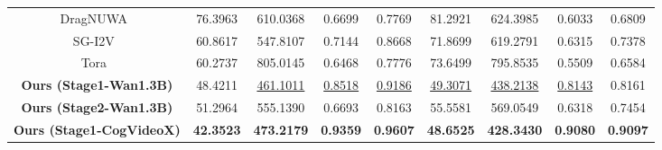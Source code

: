 \begin{table}[h]
{\begin{tabular}{c|cccc|cccc}
DragNUWA~\cite{yin2023dragnuwa}                                 & 76.3963                              & 610.0368                              & 0.6699                                    & 0.7769                                    & 81.2921                              & 624.3985                              & 0.6033                                    & 0.6809                                   \\
SG-I2V~\cite{namekata2024sgi2v}                                 & 60.8617                              & 547.8107                              & 0.7144                                    & 0.8668                                    & 71.8699                              & 619.2791                              & 0.6315                                    & 0.7378                                   \\
Tora~\cite{zhang2025tora} & 60.2737                              & 805.0145                              & 0.6468                                    & 0.7776                                    & 73.6499                              & 795.8535                              & 0.5509                                    & 0.6584                                   \\ \hline
\textbf{Ours (Stage1-Wan1.3B)}                                                                 & 48.4211                          & \underline{461.1011}                          & \underline{0.8518}                          & \underline{0.9186}                          & \underline{49.3071}                          & \underline{438.2138}                          & \underline{0.8143}                          & 0.8161                          \\
\textbf{Ours (Stage2-Wan1.3B)}                                                                 & 51.2964                          & 555.1390                          & 0.6693                          & 0.8163                          & 55.5581                          & 569.0549                          & 0.6318                          & 0.7454                          \\ \hline
\textbf{Ours (Stage1-CogVideoX)}                                                                                  & \textbf{42.3523}                               & \textbf{473.2179}                              & \textbf{0.9359}                                    & \textbf{0.9607}                                    & \textbf{48.6525}                              & \textbf{428.3430}                              & \textbf{0.9080}                                    & \textbf{0.9097}                                   \\

\end{tabular}}
\end{table}
